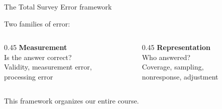 \documentclass[aspectratio=169,11pt]{beamer}
\begin{document}
\begin{frame}{The Total Survey Error framework}

Two families of error:

\vspace{1em}

\begin{columns}[T]
\begin{column}{0.45\textwidth}
\textbf{Measurement}\\[0.5em]
Is the answer correct?\\[0.3em]
\small Validity, measurement error,\\
processing error
\end{column}

\begin{column}{0.45\textwidth}
\textbf{Representation}\\[0.5em]
Who answered?\\[0.3em]
\small Coverage, sampling,\\
nonresponse, adjustment
\end{column}
\end{columns}

\vspace{1.5em}

This framework organizes our entire course.
\end{frame}
\end{document}
